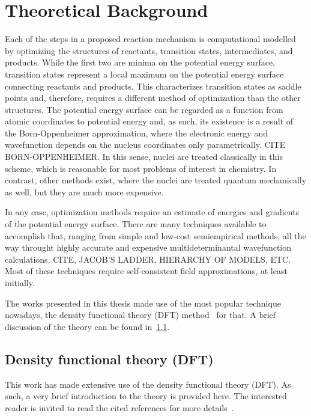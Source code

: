\section{Theoretical Background}%
\label{sec:background-methods}

Each of the steps in a proposed reaction mechanism is computational modelled
by optimizing the structures of reactants, transition states, intermediates, and products.
While the first two are minima on the potential energy surface, transition
states represent a local maximum on the potential energy surface connecting
reactants and products.
This characterizes transition states as saddle points and, therefore, requires
a different method of optimization than the other structures.
The potential energy surface can be regarded as a function from atomic coordinates to potential energy and,
as such, its existence is a result of the Born-Oppenheimer approximation,
where the electronic energy and wavefunction depends on the nucleus coordinates
only parametrically.
CITE BORN-OPPENHEIMER.\@
In this sense, nuclei are treated classically in this scheme, which is reasonable for most problems of interest in chemistry.
In contrast, other methods exist, where the nuclei are treated quantum mechanically as well,
but they are much more expensive.

In any case, optimization methods require an estimate of energies and gradients
of the potential energy surface.
There are many techniques available to accomplish that,
ranging from simple and low-cost semiempirical methods,
all the way throught highly accurate and expensive multideterminantal wavefunction calculations.
CITE, JACOB'S LADDER, HIERARCHY OF MODELS, ETC.\@
Most of these techniques require self-consistent field approximations, at least initially.

The works presented in this thesis made use of the most popular technique nowadays,
the density functional theory (DFT)
method~\cite{Hohenberg_1964,Kohn_1965,Perdew_2014,Kryachko_2014,Yu_2016} for
that.
A brief discussion of the theory can be found in~\cref{sec:dft}.

\subsection{Density functional theory (DFT)}\label{sec:dft}

This work has made extensive use of the density functional theory (DFT).
As such, a very brief introduction to the theory is provided here.
The interested reader is invited to read the cited references for more
details~\cite{Hohenberg_1964,Kohn_1965}.

